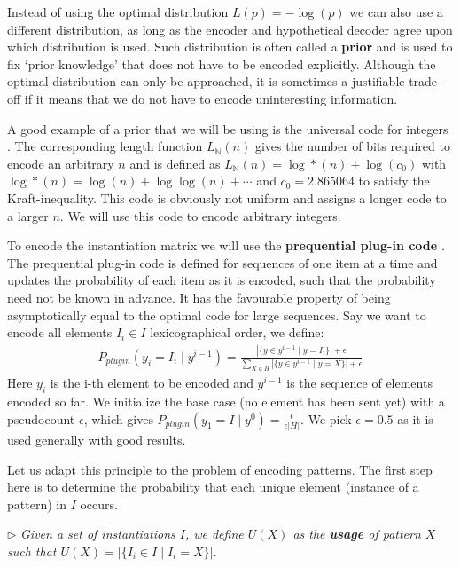 \documentclass{llncs}
\begin{document}
Instead of using the optimal distribution $L(p)=-\log(p)$ we can also use a different distribution, as long as the encoder and hypothetical decoder agree upon which distribution is used. Such distribution is often called a \textbf{prior} and is used to fix `prior knowledge' that does not have to be encoded explicitly. Although the optimal distribution can only be approached, it is sometimes a justifiable trade-off if it means that we do not have to encode uninteresting information.  

A good example of a prior that we will be using is the universal code for integers \cite{integerprior}. The corresponding length function $L_{\mathbb{N}}(n)$ gives the number of bits required to encode an arbitrary $n$ and is defined as $L_{\mathbb{N}}(n) = \log*(n) + \log(c_0)$ with $\log*(n) = \log(n) + \log \log(n) + \cdots$ and $c_0=2.865064$ to satisfy the Kraft-inequality. This code is obviously not uniform and assigns a longer code to a larger $n$. We will use this code to encode arbitrary integers.

To encode the instantiation matrix we will use the \textbf{prequential plug-in code} \cite{ppcode}. The prequential plug-in code is defined for sequences of one item at a time and updates the probability of each item as it is encoded, such that the probability need not be known in advance. It has the favourable property of being asymptotically equal to the optimal code for large sequences. Say we want to encode all elements ${I}_i \in {I}$ lexicographical order, we define:
\label{plugin}
\begin{align*}
P_{plugin}( y_i = {I}_i \mid y^{i-1} ) = \frac{|\{y \in y^{i-1} \mid y = {I}_i\}| + \epsilon }{\sum_{X \in H}|\{y \in y^{i-1} \mid y = X\}| + \epsilon}
\end{align*}
Here $y_i$ is the i-th element to be encoded and $y^{i-1}$ is the sequence of elements encoded so far. We initialize the base case (no element has been sent yet) with a pseudocount $\epsilon$, which gives $P_{plugin}( y_1 = {I} \mid y^{0} ) = \frac{\epsilon}{\epsilon|H|}$. We pick $\epsilon=0.5$ as it is used generally with good results.

Let us adapt this principle to the problem of encoding patterns. The first step here is to determine the probability that each unique element (instance of a pattern) in ${I}$ occurs. 

\label{usage}
\smallskip \noindent $\triangleright$
\emph{Given a set of instantiations ${I}$, we define $U(X)$ as the \textbf{usage} of pattern $X$ such that $U(X) = |\{ {I}_i \in {I} \mid {I}_i = X\}|.$}
\smallskip
\end{document}
